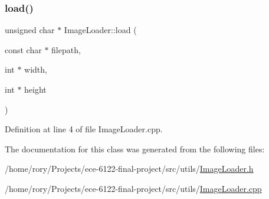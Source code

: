 \mbox{\label{class_image_loader_af2b82932ce07681d384ac827c48f76e7}} 
\subsubsection{\texorpdfstring{load()}{load()}}
{\footnotesize\ttfamily unsigned char $\ast$ Image\+Loader\+::load (\begin{DoxyParamCaption}\item[{const char $\ast$}]{filepath,  }\item[{int $\ast$}]{width,  }\item[{int $\ast$}]{height }\end{DoxyParamCaption})\hspace{0.3cm}{\ttfamily [static]}}



Definition at line 4 of file Image\+Loader.\+cpp.



The documentation for this class was generated from the following files\+:\begin{DoxyCompactItemize}
\item 
/home/rory/\+Projects/ece-\/6122-\/final-\/project/src/utils/\hyperlink{_image_loader_8h}{Image\+Loader.\+h}\item 
/home/rory/\+Projects/ece-\/6122-\/final-\/project/src/utils/\hyperlink{_image_loader_8cpp}{Image\+Loader.\+cpp}\end{DoxyCompactItemize}
